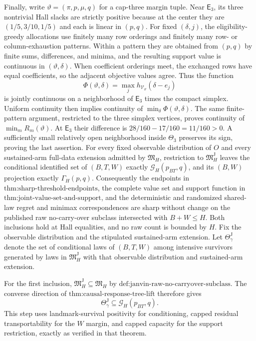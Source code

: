 Finally, write \(\vartheta=(\pi,p,\mu,q)\) for a cap-three margin tuple. Near \(\mathsf E_3\), its three nontrivial Hall slacks are strictly positive because at the center they are \((1/5,3/10,1/5)\) and each is linear in \((p,q)\). For fixed \((\delta,j)\), the eligibility-greedy allocations use finitely many row orderings and finitely many row- or column-exhaustion patterns. Within a pattern they are obtained from \((p,q)\) by finite sums, differences, and minima, and the resulting support value is continuous in \((\vartheta,\delta)\). When coefficient orderings meet, the exchanged rows have equal coefficients, so the adjacent objective values agree. Thus the function
\[
 \Phi(\vartheta,\delta)=\max_jh_{\mathcal V_\vartheta}(\delta-e_j) \tag{9}
\]
is jointly continuous on a neighborhood of \(\mathsf E_3\) times the compact simplex. Uniform continuity then implies continuity of \(\min_\delta\Phi(\vartheta,\delta)\). The same finite-pattern argument, restricted to the three simplex vertices, proves continuity of \(\min_mR_m(\vartheta)\). At \(\mathsf E_3\) their difference is \(28/160-17/160=11/160>0\). A sufficiently small relatively open neighborhood inside \(\Theta_3\) preserves its sign, proving the last assertion.
For every fixed observable distribution of \(O\) and every sustained-arm full-data extension admitted by \(\mathfrak M_H\), restriction to \(\mathfrak M_H^{\mathrm J}\) leaves the conditional identified set of \((B,T,W)\) exactly \(\mathcal G_H(p_{BT},q)\), and its \((B,W)\) projection exactly \(\Gamma_H(p,q)\). Consequently the endpoints in \(\text{thm:sharp-threshold-endpoints}\), the complete value set and support function in \(\text{thm:joint-value-set-and-support}\), and the deterministic and randomized shared-law regret and minimax correspondences are sharp without change on the published raw no-carry-over subclass intersected with \(B+W\le H\). Both inclusions hold at Hall equalities, and no raw count is bounded by \(H\).
Fix the observable distribution and the stipulated sustained-arm extension. Let \(\Theta_{\gamma}^{\mathrm J}\) denote the set of conditional laws of \((B,T,W)\) among intensive survivors generated by laws in \(\mathfrak M_H^{\mathrm J}\) with that observable distribution and sustained-arm extension.

For the first inclusion, \(\mathfrak M_H^{\mathrm J}\subseteq\mathfrak M_H\) by \(\text{def:janvin-raw-no-carryover-subclass}\). The converse direction of \(\text{thm:causal-response-tree-lift}\) therefore gives
\[
 \Theta_{\gamma}^{\mathrm J}\subseteq\mathcal G_H(p_{BT},q). \tag{1}
\]
This step uses landmark-survival positivity for conditioning, capped residual transportability for the \(W\) margin, and capped capacity for the support restriction, exactly as verified in that theorem.

